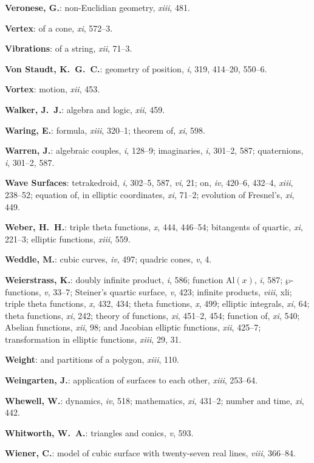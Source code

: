 \documentclass[11pt,a4paper]{article}
\newcommand{\IndexEntry}[1]{\textbf{#1}}
\newcommand{\V}[1]{\textit{#1}} %
\begin{document}
\IndexEntry{Veronese, G.}: non-Euclidian geometry, \V{xiii}, 481.

\IndexEntry{Vertex}: of a cone, \V{xi}, 572--3.

\IndexEntry{Vibrations}: of a string, \V{xii}, 71--3.

\IndexEntry{Von Staudt, K.\ G.\ C.}: geometry of position, \V{i}, 319, 414--20, 550--6.

\IndexEntry{Vortex}: motion, \V{xii}, 453.

\IndexEntry{Walker, J.\ J.}: algebra and logic, \V{xii}, 459.

\IndexEntry{Waring, E.}: formula, \V{xiii}, 320--1; theorem of, \V{xi}, 598.

\IndexEntry{Warren, J.}: algebraic couples, \V{i}, 128--9; imaginaries, \V{i}, 301--2, 587; quaternions, \V{i}, 301--2, 587.

\IndexEntry{Wave Surfaces}: tetrakedroid, \V{i}, 302--5, 587, \V{vi}, 21; on, \V{iv}, 420--6, 432--4, \V{xiii}, 238--52; equation of, in elliptic coordinates, \V{xi}, 71--2; evolution of Fresnel's, \V{xi}, 449.

\IndexEntry{Weber, H.\ H.}: triple theta functions, \V{x}, 444, 446--54; bitangents of quartic, \V{xi}, 221--3; elliptic functions, \V{xiii}, 559.

\IndexEntry{Weddle, M.}: cubic curves, \V{iv}, 497; quadric cones, \V{v}, 4.

\IndexEntry{Weierstrass, K.}: doubly infinite product, \V{i}, 586; function Al$(x)$, \V{i}, 587; $\wp$-functions, \V{v}, 33--7; Steiner's quartic surface, \V{v}, 423; infinite products, \V{viii}, xli; triple theta functions, \V{x}, 432, 434; theta functions, \V{x}, 499; elliptic integrals, \V{xi}, 64; theta functions, \V{xi}, 242; theory of functions, \V{xi}, 451--2, 454; function of, \V{xi}, 540; Abelian functions, \V{xii}, 98; and Jacobian elliptic functions, \V{xii}, 425--7; transformation in elliptic functions, \V{xiii}, 29, 31.

\IndexEntry{Weight}: and partitions of a polygon, \V{xiii}, 110.

\IndexEntry{Weingarten, J.}: application of surfaces to each other, \V{xiii}, 253--64.

\IndexEntry{Whewell, W.}: dynamics, \V{iv}, 518; mathematics, \V{xi}, 431--2; number and time, \V{xi}, 442.

\IndexEntry{Whitworth, W.\ A.}: triangles and conics, \V{v}, 593.

\IndexEntry{Wiener, C.}: model of cubic surface with twenty-seven real lines, \V{viii}, 366--84.
\end{document}
